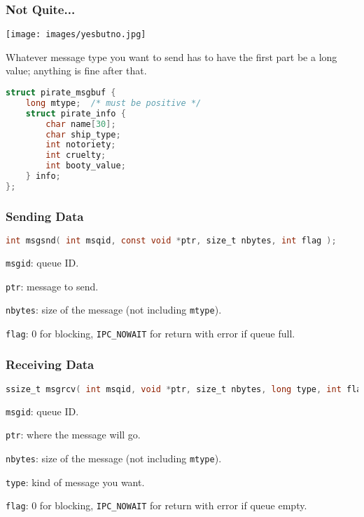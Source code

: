 \begin{frame}[fragile]
\frametitle{Not Quite...}


\begin{center}
	\texttt{[image: images/yesbutno.jpg]}
\end{center}


Whatever message type you want to send has to have the first part be a long value; anything is fine after that.

\begin{lstlisting}[language=C]
struct pirate_msgbuf {
    long mtype;  /* must be positive */
    struct pirate_info {
        char name[30];
        char ship_type;
        int notoriety;
        int cruelty;
        int booty_value;
    } info;
};
\end{lstlisting}

\end{frame}

\begin{frame}[fragile]
\frametitle{Sending Data}
\begin{lstlisting}[language=C]
int msgsnd( int msqid, const void *ptr, size_t nbytes, int flag );
\end{lstlisting}

\texttt{msgid}: queue ID.

\texttt{ptr}: message to send.

\texttt{nbytes}: size of the message (not including \texttt{mtype}).

\texttt{flag}: 0 for blocking, \texttt{IPC\_NOWAIT} for return with error if queue full.

\end{frame}


\begin{frame}[fragile]
\frametitle{Receiving Data}
\begin{lstlisting}[language=C]
ssize_t msgrcv( int msqid, void *ptr, size_t nbytes, long type, int flag );
\end{lstlisting}

\texttt{msgid}: queue ID.

\texttt{ptr}: where the message will go.

\texttt{nbytes}: size of the message (not including \texttt{mtype}).

\texttt{type}: kind of message you want.

\texttt{flag}: 0 for blocking, \texttt{IPC\_NOWAIT} for return with error if queue empty.

\end{frame}

